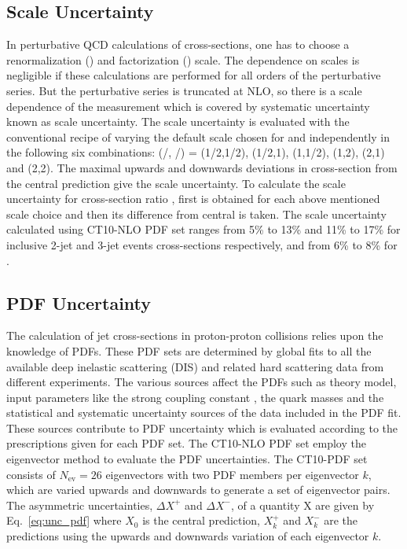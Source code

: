 \subsection{Scale Uncertainty}
\label{sec:scale_unc}
In perturbative QCD calculations of cross-sections, one has to choose a renormalization (\mur) and factorization (\muf) scale. The dependence on scales is negligible if these calculations are performed for all orders of the perturbative series. But the perturbative series is truncated at NLO, so there is a scale dependence of the measurement which is covered by systematic uncertainty known as scale uncertainty. The scale uncertainty is evaluated with the conventional recipe of varying the default scale \httwo chosen for \mur and \muf independently in the following six combinations: (\mur/\httwo, \muf/\httwo) = (1/2,1/2), (1/2,1), (1,1/2), (1,2), (2,1) and (2,2). The maximal upwards and downwards deviations in cross-section from the central prediction give the scale uncertainty. To calculate the scale uncertainty for cross-section ratio \ratio, first \ratio is obtained for each above mentioned scale choice and then its difference from central \ratio is taken. The scale uncertainty calculated using CT10-NLO PDF set ranges from 5\% to 13\% and 11\% to 17\% for inclusive 2-jet and 3-jet events cross-sections respectively, and from 6\% to 8\% for \ratio.

\subsection{PDF Uncertainty}
\label{sec:pdf_unc}
The calculation of jet cross-sections in proton-proton collisions relies upon the knowledge of PDFs. These PDF sets are determined by global fits to all the available deep inelastic scattering (DIS) and related hard scattering data from different experiments. The various sources affect the PDFs such as theory model, input parameters like the strong coupling constant \alpsns, the quark masses and the statistical and systematic uncertainty sources of the data included in the PDF fit. These sources contribute to PDF uncertainty which is evaluated according to the prescriptions given for each PDF set. The CT10-NLO PDF set \cite{Lai:2010vv,Pumplin:2002vw} employ the eigenvector method to evaluate the PDF uncertainties. The CT10-PDF set consists of $N_\mathrm{ev}=26$ eigenvectors with two PDF members per eigenvector $k$, which are varied upwards and downwards to generate a set of eigenvector pairs. The asymmetric uncertainties, $\Delta X^{+}$ and $\Delta X^{-}$, of a quantity X are given by Eq.~\ref{eq:unc_pdf} where $X_0$ is the central prediction, $X^{+}_k$ and $X^{-}_k$ are the predictions using the upwards and downwards variation of each eigenvector $k$. 

